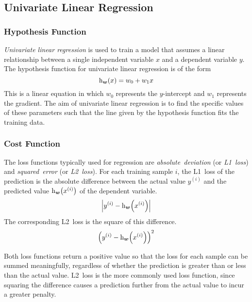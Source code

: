 \subsection{Univariate Linear Regression}

\subsubsection{Hypothesis Function}

\emph{Univariate linear regression} is used to train a model that assumes a linear relationship between a single independent variable \( x \) and a dependent variable \( y \).
The hypothesis function for univariate linear regression is of the form
\begin{equation*}
  \function[_{\boldsymbol{w}}]{h}{x} = w_{0} + w_{1} x
\end{equation*}
This is a linear equation in which \( w_{0} \) represents the \( y \)-intercept and \( w_{1} \) represents the gradient.
The aim of univariate linear regression is to find the specific values of these parameters such that the line given by the hypothesis function fits the training data.

\subsubsection{Cost Function}

The loss functions typically used for regression are \emph{absolute~deviation} (or \emph{L1~loss}) and \emph{squared~error} (or \emph{L2~loss}).
For each training sample \( i \), the L1~loss of the prediction is the absolute difference between the actual value \( y^{(i)} \) and the predicted value \( \function[_{\boldsymbol{w}}]{h}{x^{(i)}} \) of the dependent variable.
\begin{equation*}
  \left\lvert y^{(i)} - \function[_{\boldsymbol{w}}]{h}{x^{(i)}} \right\rvert
\end{equation*}
The corresponding L2~loss is the square of this difference.
\begin{equation*}
  \left( y^{(i)} - \function[_{\boldsymbol{w}}]{h}{x^{(i)}} \right)^{2}
\end{equation*}

Both loss functions return a positive value so that the loss for each sample can be summed meaningfully, regardless of whether the prediction is greater than or less than the actual value.
L2~loss is the more commonly used loss function, since squaring the difference causes a prediction further from the actual value to incur a greater penalty.

